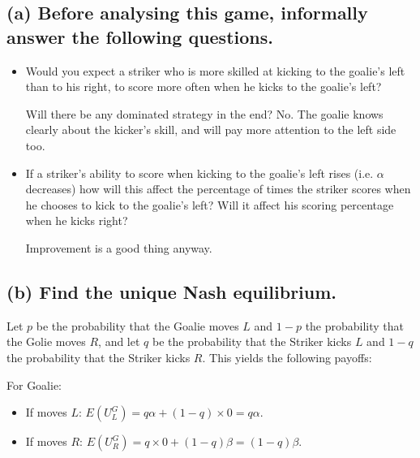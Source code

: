\documentclass{article}
\begin{document}
\subsection*{(a) Before analysing this game, informally answer the following questions.}

\begin{itemize}
\item Would you expect a striker who is more skilled at kicking to the goalie's left than to his right, to score more often when he kicks to the goalie's left?

\begin{mdframed}[backgroundcolor=blue!20,linecolor=white]
Will there be any dominated strategy in the end? No. The goalie knows clearly about the kicker's skill, and will pay more attention to the left side too.


\end{mdframed}


\item If a striker's ability to score when kicking to the goalie's left rises (i.e. $\alpha$ decreases) how will this affect the percentage of times the striker scores when he chooses to kick to the goalie's left? Will it affect his scoring percentage when he kicks right?

\begin{mdframed}[backgroundcolor=blue!20,linecolor=white]
Improvement is a good thing anyway. 
\end{mdframed}

\end{itemize}




\subsection*{(b) Find the unique Nash equilibrium.}

Let $p$ be the probability that the Goalie moves $L$ and $1-p$ the probability that the Golie moves $R$, and let $q$ be the probability that the Striker kicks $L$ and $1-q$ the probability that the Striker kicks $R$. This yields the following payoffs:

\newpage

For Goalie:
\begin{itemize}
\item If moves $L$: $E(U^G_L)= q \alpha + (1-q) \times 0 = q \alpha$.
\item If moves $R$: $E(U^G_R)=q \times 0 + (1-q) \beta =(1-q) \beta$.
\end{itemize}
\end{document}
